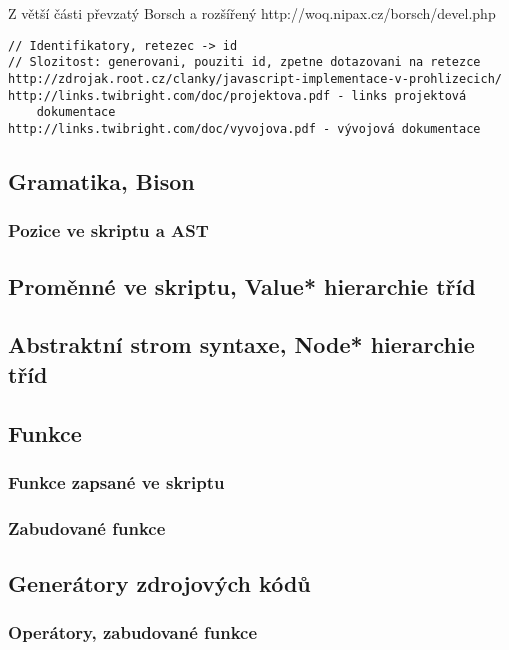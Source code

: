 \documentclass[11pt,twoside,a4paper]{book}
\begin{document}
Z větší části převzatý Borsch a rozšířený
http://woq.nipax.cz/borsch/devel.php

\begin{verbatim}
// Identifikatory, retezec -> id
// Slozitost: generovani, pouziti id, zpetne dotazovani na retezce
http://zdrojak.root.cz/clanky/javascript-implementace-v-prohlizecich/
http://links.twibright.com/doc/projektova.pdf - links projektová
	dokumentace
http://links.twibright.com/doc/vyvojova.pdf - vývojová dokumentace
\end{verbatim}


\subsection{Gramatika, Bison}

\subsubsection{Pozice ve skriptu a AST}


\subsection{Proměnné ve skriptu, Value* hierarchie tříd}

\subsection{Abstraktní strom syntaxe, Node* hierarchie tříd}


\subsection{Funkce}

\subsubsection{Funkce zapsané ve skriptu}

\subsubsection{Zabudované funkce}


\subsection{Generátory zdrojových kódů}

\subsubsection{Operátory, zabudované funkce}
\end{document}
